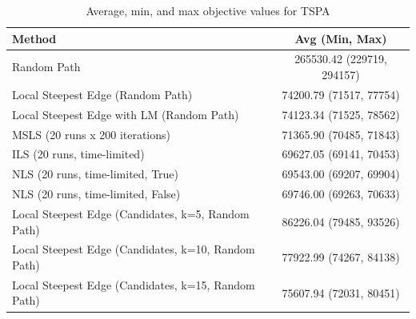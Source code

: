 \begin{table}[h!]
\centering
\begin{tabular}{lc}
\hline
Method & Avg (Min, Max) \\
\hline
Random Path & 265530.42 (229719, 294157) \\
Local Steepest Edge (Random Path) & 74200.79 (71517, 77754) \\
Local Steepest Edge with LM (Random Path) & 74123.34 (71525, 78562) \\
MSLS (20 runs x 200 iterations) & 71365.90 (70485, 71843) \\
ILS (20 runs, time-limited) & 69627.05 (69141, 70453) \\
NLS (20 runs, time-limited, True) & 69543.00 (69207, 69904) \\
NLS (20 runs, time-limited, False) & 69746.00 (69263, 70633) \\
Local Steepest Edge (Candidates, k=5, Random Path) & 86226.04 (79485, 93526) \\
Local Steepest Edge (Candidates, k=10, Random Path) & 77922.99 (74267, 84138) \\
Local Steepest Edge (Candidates, k=15, Random Path) & 75607.94 (72031, 80451) \\
\hline
\end{tabular}
\caption{Average, min, and max objective values for TSPA}
\label{tab:TSPA_scores}
\end{table}
